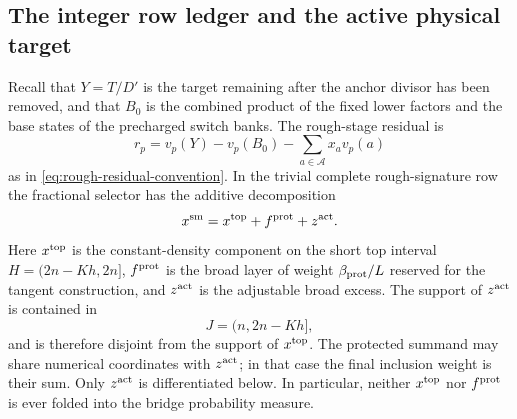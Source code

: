 \documentclass[11pt]{article}
\numberwithin{equation}{section}
\theoremstyle{definition}
\theoremstyle{remark}
\newcommand{\1}{\mathbf 1}
\begin{document}
\subsection{The integer row ledger and the active physical target}
\label{subsec:smooth-ledger}

Recall that \(Y=T/D'\) is the target remaining after the anchor divisor
has been removed, and that \(B_0\) is the combined product of the fixed
lower factors and the base states of the precharged switch banks.  The
rough-stage residual is
\[
 r_p=v_p(Y)-v_p(B_0)-\sum_{a\in\mathcal A}x_av_p(a)
\]
as in \eqref{eq:rough-residual-convention}.  In the trivial complete
rough-signature row the fractional selector has the additive
decomposition
\begin{equation}
 x^{\rm sm}=x^{\rm top}+f^{\rm prot}+z^{\rm act}.
 \label{eq:smooth-additive-decomposition}
\end{equation}
Here \(x^{\rm top}\) is the constant-density component on the short top
interval \(H=(2n-Kh,2n]\), \(f^{\rm prot}\) is the broad layer of weight
\(\beta_{\rm prot}/L\) reserved for the tangent construction, and
\(z^{\rm act}\) is the adjustable broad excess.  The support of
\(z^{\rm act}\) is contained in
\[
                 J=(n,2n-Kh],
\]
and is therefore disjoint from the support of \(x^{\rm top}\).
The protected summand may share numerical coordinates with
\(z^{\rm act}\); in that case the final inclusion weight is their sum.
Only \(z^{\rm act}\) is differentiated below.  In particular, neither
\(x^{\rm top}\) nor \(f^{\rm prot}\) is ever folded into the bridge
probability measure.
\end{document}
